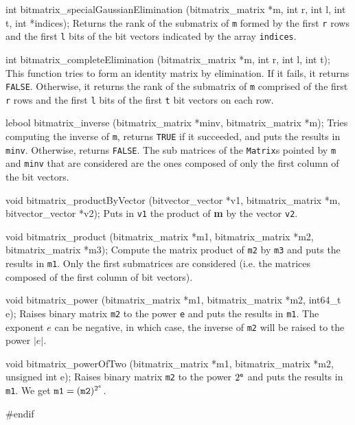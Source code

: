 int bitmatrix_specialGaussianElimination (bitmatrix_matrix *m,
                                          int r, int l, int t, int *indices);
\endcode
 \tab
Returns the rank of the submatrix of {\tt m} formed by the first {\tt r} rows
and the first {\tt l} bits of the bit vectors indicated by the array {\tt indices}.
 \endtab
 \code

int bitmatrix_completeElimination (bitmatrix_matrix *m, int r, int l, int t);
\endcode
 \tab
This function tries to form an identity matrix by elimination. If it fails, it returns {\tt FALSE}.
Otherwise, it returns the rank of the submatrix of {\tt m} comprised of the first
{\tt r} rows and the first {\tt l} bits of the first {\tt t} bit vectors on each row.
 \endtab
\code

lebool bitmatrix_inverse (bitmatrix_matrix *minv, bitmatrix_matrix *m);
\endcode
\tab
Tries computing the inverse of {\tt m}, returns {\tt TRUE} if it succeeded, and puts the results in {\tt minv}.
Otherwise, returns {\tt FALSE}.
The sub matrices of the {\tt Matrix}s pointed by {\tt m} and {\tt minv} that
are considered are the ones composed of only the first column of the bit vectors.
 \endtab
\code

void bitmatrix_productByVector (bitvector_vector *v1, bitmatrix_matrix *m,
                                bitvector_vector *v2);
\endcode
\tab
Puts in {\tt v1} the product of {\bf m} by the vector {\tt v2}.
 \endtab
\code

void bitmatrix_product (bitmatrix_matrix *m1, bitmatrix_matrix *m2,
                        bitmatrix_matrix *m3);
\endcode
\tab
Compute the matrix product of {\tt m2} by {\tt m3} and puts the results in {\tt m1}.
Only the first submatrices are considered (i.e. the matrices composed of the first column of bit vectors).
\endtab
\code

void bitmatrix_power (bitmatrix_matrix *m1, bitmatrix_matrix *m2, int64_t e);
\endcode
\tab
Raises binary matrix {\tt m2} to the power {\tt e} and puts the results in {\tt m1}.
The exponent $e$ can be negative, in which case, the inverse of {\tt m2}
will be raised to the power $|e|$.
\endtab
\code

void bitmatrix_powerOfTwo (bitmatrix_matrix *m1, bitmatrix_matrix *m2,
                           unsigned int e);
\endcode
\tab
Raises binary matrix {\tt m2} to the power $2^{\tt e}$ and puts the results in {\tt m1}.
We get ${\tt m1} = ({\tt m2})^{2^{e}}$.
\endtab

\code\hide
#endif
\endhide\endcode

